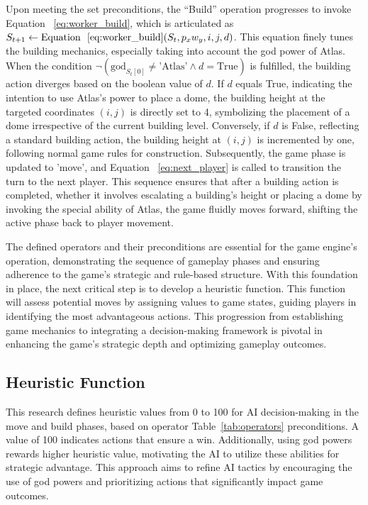 \documentclass{telkomnika}
\begin{document}
Upon meeting the set preconditions, the ``Build'' operation progresses to invoke Equation ~\ref{eq:worker_build}, which is articulated as \( S_{t+1} \gets \text{Equation ~\ref{eq:worker_build}}(S_t, p_xw_y, i, j, d) \). This equation finely tunes the building mechanics, especially taking into account the god power of Atlas. When the condition \( \neg (\text{god}_{S_t[0]} \neq \text{'Atlas'} \land d = \text{True})\) is fulfilled, the building action diverges based on the boolean value of \( d \). If \( d \) equals True, indicating the intention to use Atlas's power to place a dome, the building height at the targeted coordinates \((i, j)\) is directly set to 4, symbolizing the placement of a dome irrespective of the current building level. Conversely, if \( d \) is False, reflecting a standard building action, the building height at \((i, j)\) is incremented by one, following normal game rules for construction. Subsequently, the game phase is updated to 'move', and Equation ~\ref{eq:next_player} is called to transition the turn to the next player. This sequence ensures that after a building action is completed, whether it involves escalating a building's height or placing a dome by invoking the special ability of Atlas, the game fluidly moves forward, shifting the active phase back to player movement. 

The defined operators and their preconditions are essential for the game engine's operation, demonstrating the sequence of gameplay phases and ensuring adherence to the game's strategic and rule-based structure. With this foundation in place, the next critical step is to develop a heuristic function. This function will assess potential moves by assigning values to game states, guiding players in identifying the most advantageous actions. This progression from establishing game mechanics to integrating a decision-making framework is pivotal in enhancing the game's strategic depth and optimizing gameplay outcomes.

\subsection{Heuristic Function}

This research defines heuristic values from 0 to 100 for AI decision-making in the move and build phases, based on operator Table~\ref{tab:operators} preconditions. A value of 100 indicates actions that ensure a win. Additionally, using god powers rewards higher heuristic value, motivating the AI to utilize these abilities for strategic advantage. This approach aims to refine AI tactics by encouraging the use of god powers and prioritizing actions that significantly impact game outcomes.
\end{document}
